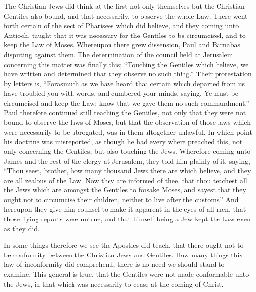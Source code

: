 The Christian Jews did think at the first not only themselves but the Christian Gentiles also bound, and that necessarily, to observe the whole Law. There went forth certain of the sect of Pharisees which did believe, and they coming unto Antioch, taught that it was necessary for the Gentiles to be circumcised, and to keep the Law of Moses. Whereupon there grew dissension, Paul and Barnabas disputing against them. The determination of the council held at Jerusalem concerning this matter was finally this; “Touching the Gentiles which believe, we have written and determined that they observe no such thing.” Their protestation by letters is, “Forasmuch as we have heard that certain which departed from us have troubled you with words, and cumbered your minds, saying, Ye must be circumcised and keep the Law; know that we gave them no such commandment.” Paul therefore continued still teaching the Gentiles, not only that they were not bound to observe the laws of Moses, but  that the observation of those laws which were necessarily to be abrogated, was in them altogether unlawful. In which point his doctrine was misreported, as though he had every where preached this, not only concerning the Gentiles, but also touching the Jews. Wherefore coming unto James and the rest of the clergy at Jerusalem, they told him plainly of it, saying, “Thou seest, brother, how many thousand Jews there are which believe, and they are all zealous of the Law. Now they are informed of thee, that thou teachest all the Jews which are amongst the Gentiles to forsake Moses, and sayest that they ought not to circumcise their children, neither to live after the customs.” And hereupon they give him counsel to make it apparent in the eyes of all men, that those flying reports were untrue, and that himself being a Jew kept the Law even as they did.

In some things therefore we see the Apostles did teach, that there ought not to be conformity between the Christian Jews and Gentiles. How many things this law of inconformity did comprehend, there is no need we should stand to examine. This general is true, that the Gentiles were not made conformable unto the Jews, in that which was necessarily to cease at the coming of Christ.

